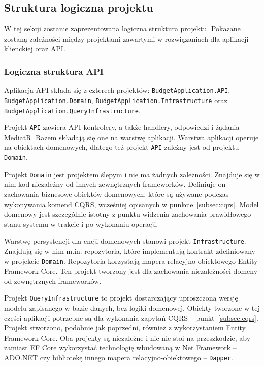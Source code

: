 \subsection{Struktura logiczna projektu}
\label{sec:struktura-logiczna-projektu}

W tej sekcji zostanie zaprezentowana logiczna struktura projektu. 
Pokazane zostaną zależności między projektami zawartymi w rozwiązaniach dla aplikacji klienckiej oraz API.

\subsubsection{Logiczna struktura API}

Aplikacja API składa się z czterech projektów: \texttt{BudgetApplication.API}, \texttt{BudgetApplication.Domain}, \texttt{BudgetApplication.Infrastructure} oraz \texttt{BudgetApplication.QueryInfrastructure}.

Projekt \texttt{API} zawiera API kontrolery, a także handlery, odpowiedzi i żądania MediatR. Razem składają się one na warstwę aplikacji. Warstwa aplikacji operuje na obiektach domenowych, dlatego też projekt \texttt{API} zależny jest od projektu \texttt{Domain}.

Projekt \texttt{Domain} jest projektem ślepym i nie ma żadnych zależności. Znajduje się w nim kod niezależny od innych zewnętrznych frameworków. Definiuje on zachowania biznesowe obiektów domenowych, które są używane podczas wykonywania komend CQRS, wcześniej opisanych w punkcie~\ref{subsec:cqrs}. Model domenowy jest szczególnie istotny z punktu widzenia zachowania prawidłowego stanu systemu w trakcie i po wykonaniu operacji.

Warstwę persystencji dla encji domenowych stanowi projekt \texttt{Infrastructure}. Znajdują się w nim m.in. repozytoria, które implementują kontrakt zdefiniowany w projekcie \texttt{Domain}. Repozytoria korzystają mapera relacyjno-obiektowego Entity Framework Core. Ten projekt tworzony jest dla zachowania niezależności domeny od zewnętrznych frameworków.

Projekt \texttt{QueryInfrastructure} to projekt dostarczający uproszczoną wersję modelu zapisanego w bazie danych, bez logiki domenowej. Obiekty tworzone w tej części aplikacji potrzebne są dla wykonania zapytań CQRS -- punkt~\ref{subsec:cqrs}. Projekt stworzono, podobnie jak poprzedni, również z wykorzystaniem Entity Framework Core. Oba projekty są niezależne i nic nie stoi na przeszkodzie, aby zamiast EF Core wykorzystać technologię wbudowaną w Net Framework -- ADO.NET czy bibliotekę innego mapera relacyjno-obiektowego -- \texttt{Dapper}.

